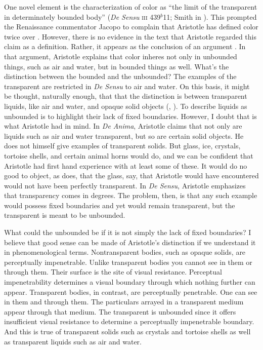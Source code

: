 One novel element is the characterization of color as ``the limit of the transparent in determinately bounded body'' (\emph{De Sensu} \textsc{iii} 439\( ^{b} \)11; Smith in \citealt[8]{Barnes:1984uq}). This prompted the Renaissance commentator Jacopo \citet{Zabarella:1605kx} to complain that Aristotle has defined color twice over \citep{Broackes:1999uq}. However, there is no evidence in the text that Aristotle regarded this claim as a definition. Rather, it appears as the conclusion of an argument \citep[65]{Broackes:1999uq}. In that argument, Aristotle explains that color inheres not only in unbounded things, such as air and water, but in bounded things as well. What's the distinction between the bounded and the unbounded? The examples of the transparent are restricted in \emph{De Sensu} to air and water. On this basis, it might be thought, naturally enough, that that the distinction is between transparent liquids, like air and water, and opaque solid objects (\citealt[59]{Broackes:1999uq}, \citealt[131]{Sorabji:2004fk}). To describe liquids as unbounded is to highlight their lack of fixed boundaries. However, I doubt that is what Aristotle had in mind. In \emph{De Anima}, Aristotle claims that not only are liquids such as air and water transparent, but so are certain solid objects. He does not himself give examples of transparent solids. But glass, ice, crystals, tortoise shells, and certain animal horns would do, and we can be confident that Aristotle had first hand experience with at least some of these. It would do no good to object, as \citet[131]{Sorabji:2004fk} does, that the glass, say, that Aristotle would have encountered would not have been perfectly transparent. In \emph{De Sensu}, Aristotle emphasizes that transparency comes in degrees. The problem, then, is that any such example would possess fixed boundaries and yet would remain transparent, but the transparent is meant to be unbounded. 

What could the unbounded be if it is not simply the lack of fixed boundaries? I believe that good sense can be made of Aristotle's distinction if we understand it in phenomenological terms. Nontransparent bodies, such as opaque solids, are perceptually impenetrable. Unlike transparent bodies you cannot see in them or through them. Their surface is the site of visual resistance. Perceptual impenetrability determines a visual boundary through which nothing further can appear. Transparent bodies, in contrast, are perceptually penetrable. One can see in them and through them. The particulars arrayed in a transparent medium appear through that medium. The transparent is unbounded since it offers insufficient visual resistance to determine a perceptually impenetrable boundary. And this is true of transparent solids such as crystals and tortoise shells as well as transparent liquids such as air and water.

